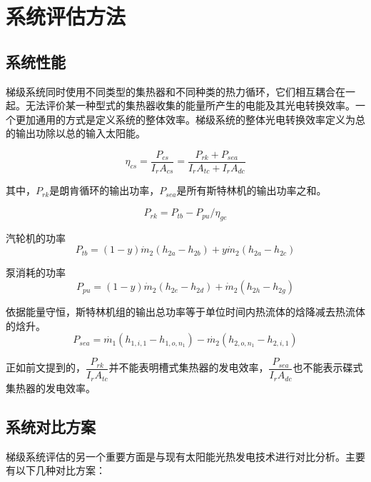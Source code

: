 \section{系统评估方法}
\subsection{系统性能}

梯级系统同时使用不同类型的集热器和不同种类的热力循环，它们相互耦合在一起。无法评价某一种型式的集热器收集的能量所产生的电能及其光电转换效率。一个更加通用的方式是定义系统的整体效率。梯级系统的整体光电转换效率定义为总的输出功除以总的输入太阳能。

\begin{equation}
	\eta_{cs}=\dfrac{P_{cs}}{I_rA_{cs}} = \dfrac{P_{rk}+ P_{sea}}{I_rA_{tc} + I_rA_{dc}}
\end{equation}

其中，$P_{rk}$是朗肯循环的输出功率，$P_{sea}$是所有斯特林机的输出功率之和。

\begin{equation}
	P_{rk} = P_{tb} - P_{pu} / \eta_{ge}
\end{equation}

汽轮机的功率
\begin{equation}
  P_{tb}=\left(1-y\right)\dot{m}_{2}\left(h_{2a}-h_{2b}\right)+y\dot{m}_{2}\left(h_{2a}-h_{2c}\right)
\end{equation}

泵消耗的功率
\begin{equation}
	P_{pu}=\left(1-y\right)\dot{m}_{2}\left(h_{2e}-h_{2d}\right)+\dot{m}_{2}\left(h_{2h}-h_{2g}\right)
\end{equation}

依据能量守恒，斯特林机组的输出总功率等于单位时间内热流体的焓降减去热流体的焓升。
\begin{equation}
	P_{sea}=\dot{m_1}(h_{1,i,1} - h_{1,o,n_1}) - \dot{m_2}(h_{2,o,n_1} - h_{2,i,1})
\end{equation}

正如前文提到的，$\dfrac{P_{rk}}{I_rA_{tc}}$并不能表明槽式集热器的发电效率，$\dfrac{P_{sea}}{I_rA_{dc}}$也不能表示碟式集热器的发电效率。

\subsection{系统对比方案}

梯级系统评估的另一个重要方面是与现有太阳能光热发电技术进行对比分析。主要有以下几种对比方案：

